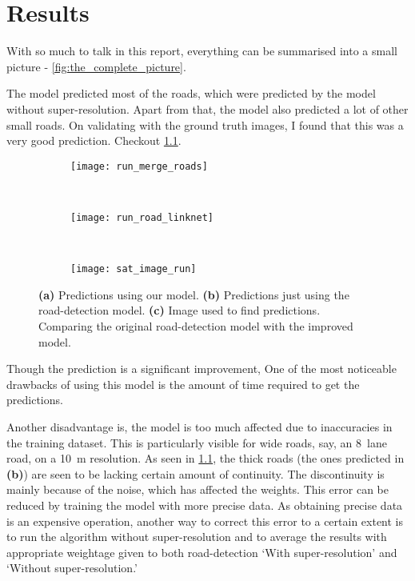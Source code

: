 \chapter{Results}\label{chapt:results}

With so much to talk in this report, everything can be summarised into a small picture - \cref{fig:the_complete_picture}.

The model predicted most of the roads, which were predicted by the model without super-resolution. Apart from that, the model also predicted a lot of other small roads. On validating with the ground truth images, I found that this was a very good prediction. Checkout \cref{fig:run_merge_road_maps}.

\begin{figure}[h!]
  \centering
  \begin{subfigure}{0.55\textwidth}
    \texttt{[image: run\_merge\_roads]}
    \caption{}
  \end{subfigure}~
  \begin{subfigure}{0.21\textwidth}
    \texttt{[image: run\_road\_linknet]}
    \caption{}
  \end{subfigure}~
  \begin{subfigure}{0.21\textwidth}
    \texttt{[image: sat\_image\_run]}
    \caption{}
  \end{subfigure}
  \caption[Predictions]{\textbf{(a)} Predictions using our model. \textbf{(b)} Predictions just using the road-detection model. \textbf{(c)} Image used to find predictions. Comparing the original road-detection model with the improved model.}
  \label{fig:run_merge_road_maps}
\end{figure}


Though the prediction is a significant improvement, One of the most noticeable drawbacks of using this model is the amount of time required to get the predictions. 

Another disadvantage is, the model is too much affected due to inaccuracies in the training dataset. This is particularly visible for wide roads, say, an 8~lane road, on a 10~m resolution. As seen in \cref{fig:run_merge_road_maps}, the thick roads (the ones predicted in \textbf{(b)}) are seen to be lacking certain amount of continuity. The discontinuity is mainly because of the noise, which has affected the weights. This error can be reduced by training the model with more precise data. As obtaining precise data is an expensive operation, another way to correct this error to a certain extent is to run the algorithm without super-resolution and to average the results with appropriate weightage given to both road-detection `With super-resolution' and `Without super-resolution.'

